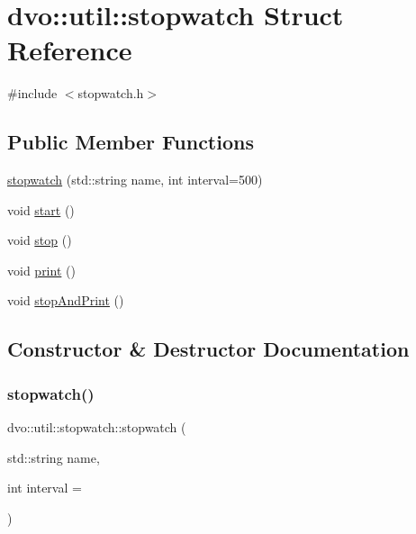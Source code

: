\hypertarget{structdvo_1_1util_1_1stopwatch}{}\section{dvo\+:\+:util\+:\+:stopwatch Struct Reference}
\label{structdvo_1_1util_1_1stopwatch}


{\ttfamily \#include $<$stopwatch.\+h$>$}

\subsection*{Public Member Functions}
\begin{DoxyCompactItemize}
\item 
\mbox{\hyperlink{structdvo_1_1util_1_1stopwatch_a6b1ee798389c913c61177861dedb4693}{stopwatch}} (std\+::string name, int interval=500)
\item 
void \mbox{\hyperlink{structdvo_1_1util_1_1stopwatch_ad14947a34619a224e72699aead6b0f01}{start}} ()
\item 
void \mbox{\hyperlink{structdvo_1_1util_1_1stopwatch_ae683c5f288c5446828f0746e2f9e1a83}{stop}} ()
\item 
void \mbox{\hyperlink{structdvo_1_1util_1_1stopwatch_a73f99701c87e6491a96b1ab9687eb9e1}{print}} ()
\item 
void \mbox{\hyperlink{structdvo_1_1util_1_1stopwatch_a216a413789cc4fe6332303c7333b5a05}{stop\+And\+Print}} ()
\end{DoxyCompactItemize}


\subsection{Constructor \& Destructor Documentation}
\mbox{\label{structdvo_1_1util_1_1stopwatch_a6b1ee798389c913c61177861dedb4693}} 
\subsubsection{\texorpdfstring{stopwatch()}{stopwatch()}}
{\footnotesize\ttfamily dvo\+::util\+::stopwatch\+::stopwatch (\begin{DoxyParamCaption}\item[{std\+::string}]{name,  }\item[{int}]{interval = {} }\end{DoxyParamCaption})\hspace{0.3cm}{\ttfamily [inline]}}



